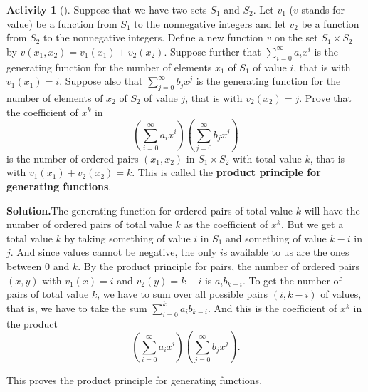 \documentclass[10pt,]{book}
\newcommand{\terminology}[1]{\textbf{#1}}
\theoremstyle{plain}
\theoremstyle{definition}
\newtheorem{activity}[project]{Activity}
\numberwithin{equation}{chapter}
\begin{document}
\begin{activity}[]\label{ProductPrincipleOGF}
Suppose that we have two sets \(S_1\) and \(S_2\). Let \(v_1\) (\(v\) stands for value) be a function from \(S_1\) to the nonnegative integers and let \(v_2\) be a function from \(S_2\) to the nonnegative integers.  Define a new function \(v\) on the set \(S_1 \times S_2\) by \(v(x_1,x_2) = v_1(x_1) +v_2(x_2)\). Suppose further that \(\sum_{i=0}^\infty a_ix^i\) is the generating function for the number of elements \(x_1\) of \(S_1\) of value \(i\), that is with \(v_1(x_1)=i\). Suppose also that \(\sum_{j=0}^\infty b_j x^j\) is the generating function for the number of elements of \(x_2\) of \(S_2\) of value \(j\), that is with \(v_2(x_2) = j\).  Prove that the coefficient of \(x^k\) in%
\begin{equation*}
\left(\sum_{i=0}^\infty a_ix^i\right)\left(\sum_{j=0}^\infty
b_jx^j\right)
\end{equation*}
is the number of ordered pairs \((x_1,x_2)\) in \(S_1\times S_2\) with total value \(k\), that is with \(v_1(x_1) +v_2(x_2) =k\). This is called the \terminology{product principle for generating functions}.%
\par\medskip\noindent%
\textbf{Solution.}\quad The generating function for ordered pairs of total value \(k\) will have the number of ordered pairs of total value \(k\) as the coefficient of \(x^k\). But we get a total value \(k\) by taking something of value \(i\) in \(S_1\) and something of value \(k-i\) in \(j\). And since values cannot be negative, the only \(i\)s available to us are the ones between \(0\) and \(k\). By the product principle for pairs, the number of ordered pairs \((x,y)\) with \(v_1(x)=i\) and \(v_2(y)=k-i\) is \(a_ib_{k-i}\). To get the number of pairs of total value \(k\), we have to sum over all possible pairs \((i,k-i)\) of values, that is, we have to take the sum \(\sum_{i=0}^k a_ib_{k-i}\). And this is the coefficient of \(x^k\) in the product%
\begin{equation*}
\left(\sum_{i=0}^\infty a_ix^i\right)\left(\sum_{j=0}^\infty
b_jx^j\right).
\end{equation*}
%
\par
This proves the product principle for generating functions.%
\end{activity}
\end{document}
